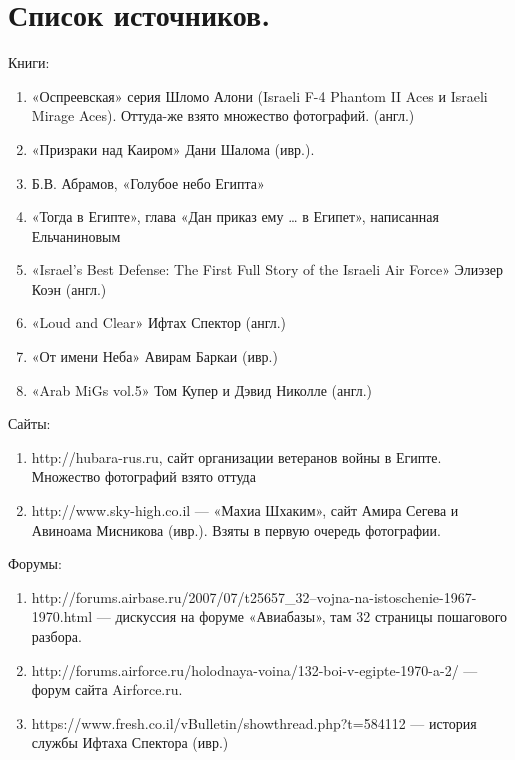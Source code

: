 \section{Список источников.}

Книги:

\begin{enumerate}
	
	
	\item  «Оспреевская» серия Шломо Алони (Israeli F-4 Phantom II Aces и Israeli Mirage Aces). Оттуда-же взято множество фотографий. (англ.)
	
	\item  «Призраки над Каиром» Дани Шалома (ивр.).
	
	\item  Б.В. Абрамов, «Голубое небо Египта»
	
	\item  «Тогда в Египте», глава «Дан приказ ему … в Египет», написанная Ельчаниновым
	
	\item  «Israel's Best Defense: The First Full Story of the Israeli Air Force» Элиэзер Коэн (англ.)
	
	\item  «Loud and Clear» Ифтах Спектор (англ.)
	
	\item  «От имени Неба» Авирам Баркаи (ивр.)
	
	\item  «Arab MiGs vol.5» Том Купер и Дэвид Николле (англ.)
\end{enumerate}
Сайты:
\begin{enumerate}
	
	
	\item  http://hubara-rus.ru, сайт организации ветеранов войны в Египте. Множество фотографий взято оттуда
	
	\item  http://www.sky-high.co.il — «Махиа Шхаким», сайт Амира Сегева и Авиноама Мисникова (ивр.). Взяты в первую очередь фотографии.
\end{enumerate}
Форумы:
\begin{enumerate}
	
	\item  http://forums.airbase.ru/2007/07/t25657\_32--vojna-na-istoschenie-1967-1970.html — дискуссия на форуме «Авиабазы», там 32 страницы пошагового разбора.
	
	\item  http://forums.airforce.ru/holodnaya-voina/132-boi-v-egipte-1970-a-2/ — форум сайта Airforce.ru.
	
	\item  https://www.fresh.co.il/vBulletin/showthread.php?t=584112 — история службы Ифтаха Спектора (ивр.)
\end{enumerate}
